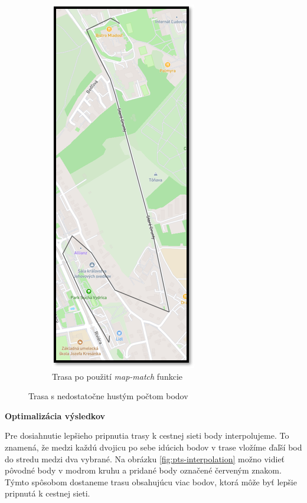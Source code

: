 \begin{figure}[H]
\begin{subfigure}{0.45\textwidth}
        \centering
        \includegraphics[width=.5\textwidth]{img/map-match rozdiel/malo bodov po.png}
        \caption{Trasa po použití \textit{map-match} funkcie}
        \label{fig:map-match-low-points-after}
    \end{subfigure}
    \caption{Trasa s nedostatočne hustým počtom bodov}
    \label{fig:map-match-low-points}
\end{figure}

\noindent\textbf{Optimalizácia výsledkov}

Pre dosiahnutie lepšieho pripnutia trasy k cestnej sieti body interpolujeme. To znamená, že medzi každú dvojicu po sebe idúcich bodov v trase vložíme ďaľší bod do stredu medzi dva vybrané. Na obrázku \ref{fig:pts-interpolation} možno vidieť pôvodné body v modrom kruhu a pridané body označené červeným znakom. Týmto spôsobom dostaneme trasu obsahujúcu viac bodov, ktorá môže byť lepšie pripnutá k cestnej sieti.  

